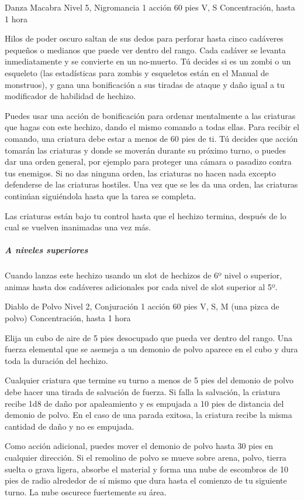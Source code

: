 \documentclass[a4paper,twocolumn,openany,10pt]{dndbook}
\begin{document}
\spellheader%
	{Danza Macabra}
	{Nivel 5, Nigromancia}
	{1 acción}
	{60 pies}
	{V, S}
	{Concentración, hasta 1 hora}
	
	Hilos de poder oscuro saltan de sus dedos para perforar hasta cinco cadáveres pequeños o medianos que puede ver dentro del
	rango. Cada cadáver se levanta inmediatamente y se convierte en un no-muerto. Tú decides si es un zombi o un esqueleto (las
	estadísticas para zombis y esqueletos están en el Manual de monstruos), y gana una bonificación a sus tiradas de ataque y
	daño igual a tu modificador de habilidad de hechizo.
	
	Puedes usar una acción de bonificación para ordenar mentalmente a las criaturas que hagas con este hechizo, dando el mismo
	comando a todas ellas. Para recibir el comando, una criatura debe estar a menos de 60 pies de ti. Tú decides que acción
	tomarán las criaturas y donde se moverán durante su próximo turno, o puedes dar una orden general, por ejemplo para proteger
	una cámara o pasadizo contra tus enemigos. Si no das ninguna orden, las criaturas no hacen nada excepto defenderse de las
	criaturas hostiles. Una vez que se les da una orden, las criaturas continúan siguiéndola hasta que la tarea se completa.
	
	Las criaturas están bajo tu control hasta que el hechizo termina, después de lo cual se vuelven inanimadas una vez más.
	
	\subparagraph{A niveles superiores} Cuando lanzas este hechizo usando un slot de hechizos de 6º nivel o superior, animas
	hasta dos cadáveres adicionales por cada nivel de slot superior al 5º. 

\spellheader%
	{Diablo de Polvo}
	{Nivel 2, Conjuración}
	{1 acción}
	{60 pies}
	{V, S, M (una pizca de polvo)}
	{Concentración, hasta 1 hora}
	
	Elija un cubo de aire de 5 pies desocupado que pueda ver dentro del rango. Una fuerza elemental que se asemeja a un demonio
	de polvo aparece en el cubo y dura toda la duración del hechizo.
	
	Cualquier criatura que termine su turno a menos de 5 pies del demonio de polvo debe hacer una tirada de salvación de fuerza.
	Si falla la salvación, la criatura recibe 1d8 de daño por apaleamiento y es empujada a 10 pies de distancia del demonio de
	polvo. En el caso de una parada exitosa, la criatura recibe la misma cantidad de daño y no es empujada.
	
	Como acción adicional, puedes mover el demonio de polvo hasta 30 pies en cualquier dirección. Si el remolino de polvo se
	mueve sobre arena, polvo, tierra suelta o grava ligera, absorbe el material y forma una nube de escombros de 10 pies de
	radio alrededor de sí mismo que dura hasta el comienzo de tu siguiente turno. La nube oscurece fuertemente su área.
	
\end{document}
